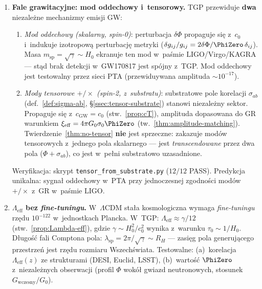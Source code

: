 \begin{enumerate}[nosep]
  \item \textbf{Fale grawitacyjne: mod oddechowy i~tensorowy.}
        TGP przewiduje \textbf{dwa} niezale\.zne mechanizmy emisji GW:
        \begin{enumerate}[nosep]
          \item \emph{Mod oddechowy (skalarny, spin-0)}: perturbacja
                $\delta\Phi$ propaguje si\k{e} z~$c_0$ i~indukuje
                izotropow\k{a} perturbacj\k{e} metryki
                ($\delta g_{ij}/g_{ij} = 2\delta\Phi/\PhiZero\,\delta_{ij}$).
                Masa $m_{\mathrm{sp}} = \sqrt{\gamma} \sim H_0$
                ekranuje ten mod w~pa\'smie LIGO/Virgo/KAGRA ---
                st\k{a}d brak detekcji w~GW170817 jest sp\'ojny z~TGP.
                Mod oddechowy jest testowalny przez sieci PTA
                (prze\-widuywana amplituda $\sim 10^{-17}$).
          \item \emph{Mody tensorowe $+/\times$ (spin-2, z~substratu)}:
                substratowe pole korelacji $\sigma_{ab}$ (def.~\ref{def:sigma-ab},
                \S\ref{ssec:tensor-substrate}) stanowi niezale\.zny sektor.
                Propaguje si\k{e} z~$c_{\mathrm{GW}} = c_0$ (stw.~\ref{prop:cT}),
                amplituda dopasowana do GR warunkiem
                $\xi_{\mathrm{eff}} = 4\pi G_0\sigma_0\PhiZero$
                (tw.~\ref{thm:amplitude-matching}).
                Twierdzenie~\ref{thm:no-tensor} \textbf{nie} jest sprzeczne:
                zakazuje mod\'ow tensorowych z~jednego pola skalarnego ---
                jest \emph{transcendowane} przez dwa pola
                ($\Phi + \sigma_{ab}$), co jest w~pe\l{}ni
                substratowo uzasadnione.
        \end{enumerate}
        Weryfikacja: skrypt \texttt{tensor\_from\_substrate.py}
        ($12/12$ PASS). Predykcja unikalna: sygna\l{} oddechowy w~PTA
        przy jednoczesnej zgodno\'sci mod\'ow $+/\times$ z~GR
        w~pa\'smie LIGO.

  \item \textbf{$\Lambda_{\mathrm{eff}}$ bez \emph{fine-tuningu}.}
        W~$\Lambda$CDM sta\l{}a kosmologiczna wymaga
        \emph{fine-tuningu} rz\k{e}du $10^{-122}$ w~jednostkach
        Plancka. W~TGP: $\Lambda_{\mathrm{eff}} \approx \gamma/12$
        (stw.~\ref{prop:Lambda-eff}), gdzie $\gamma \sim H_0^2/c_0^2$
        wynika z~warunku $\tau_0 \sim 1/H_0$.
        D\l{}ugo\'s\'c fali Comptona pola:
        $\lambda_{\mathrm{sp}} = 2\pi/\sqrt{\gamma} \sim R_H$
        --- zasi\k{e}g pola generuj\k{a}cego przestrze\'n
        jest rz\k{e}du rozmiaru Wszech\'swiata.
        Testowalne: (a)~korelacja $\Lambda_{\mathrm{eff}}(z)$
        ze strukturami (DESI, Euclid, LSST),
        (b)~warto\'s\'c $\PhiZero$ z~niezale\.znych
        obserwacji (profil $\Phi$ wok\'o\l{} gwiazd neutronowych,
        stosunek $G_{\mathrm{wczesny}}/G_0$).


\end{enumerate}
